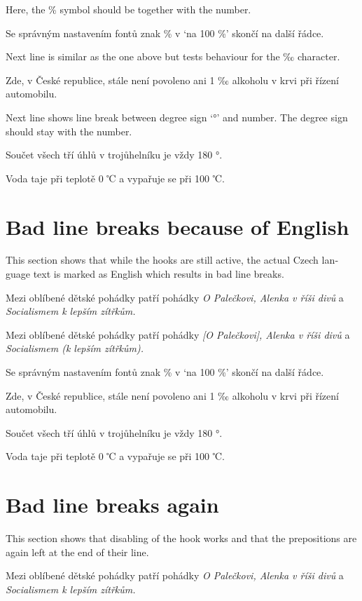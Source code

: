 \documentclass{article}
\newcommand{\expl}[1]{\begin{english}\sffamily #1\end{english}}
\begin{document}
\expl{Here, the \% symbol should be together with the number.}

Se správným nastavením fontů znak \% v `na 100 \%' skončí na další řádce.

\expl{Next line is similar as the one above but tests behaviour for the ‰
  character.}

Zde, v České republice, stále není povoleno ani 1 ‰ alkoholu v krvi při
řízení automobilu.

\expl{Next line shows line break between degree sign `°' and number. The
  degree sign should stay with the number.}

Součet všech tří úhlů v trojůhelníku je vždy 180 °.

Voda taje při teplotě 0 ℃ a vypařuje se při 100 ℃.


\section{Bad line breaks because of English}
\expl{This section shows that while the hooks are still active, the actual
  Czech language text is marked as English which results in bad line breaks.}

\begin{english}
Mezi oblíbené dětské pohádky patří pohádky \emph{O Palečkovi, Alenka v říši
  divů} a \emph{Socialismem k lepším zítřkům.}

Mezi oblíbené dětské pohádky patří pohádky \emph{[O Palečkovi], Alenka v říši
  divů} a \emph{Socialismem (k lepším zítřkům).}

Se správným nastavením fontů znak \% v `na 100 \%' skončí na další řádce.

Zde, v České republice, stále není povoleno ani 1 ‰ alkoholu v krvi při
řízení automobilu.

Součet všech tří úhlů v trojůhelníku je vždy 180 °.

Voda taje při teplotě 0 ℃ a vypařuje se při 100 ℃.
\end{english}


\section{Bad line breaks again}
\expl{This section shows that disabling of the hook works and that the
  prepositions are again left at the end of their line.}

\cstypoSingleLetterDisable{}
\cstypoPercentsDisable{}
\cstypoALetterDisable{}

Mezi oblíbené dětské pohádky patří pohádky \emph{O Palečkovi, Alenka v říši
  divů} a \emph{Socialismem k lepším zítřkům.}
\end{document}
